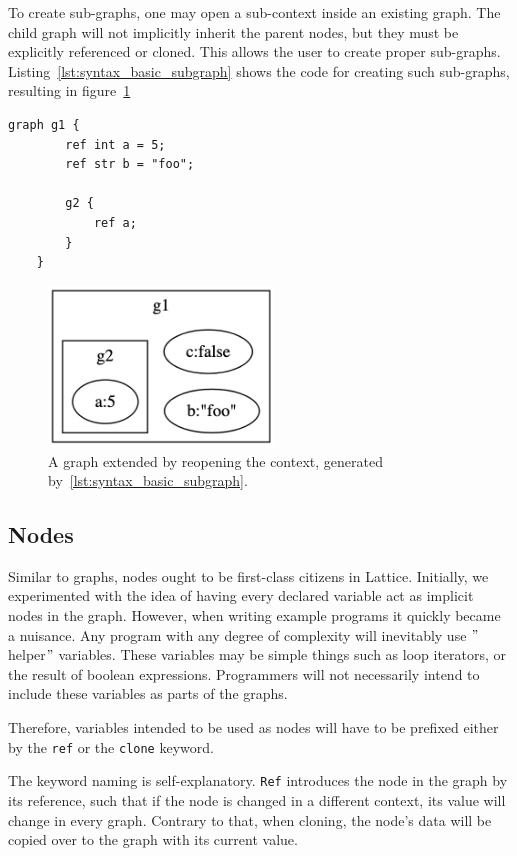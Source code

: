 To create sub-graphs, one may open a sub-context inside an existing graph.
The child graph will not implicitly inherit the parent nodes, but they must be explicitly referenced or cloned.
This allows the user to create proper sub-graphs.
Listing~\ref{lst:syntax_basic_subgraph} shows the code for creating such sub-graphs, resulting in figure~\ref{fig:syntax_basic_subgraph}

\begin{lstlisting}[caption={Creating a sub-graph g2 in the context of g1},captionpos=b, label={lst:syntax_basic_subgraph}]
    graph g1 {
        ref int a = 5;
        ref str b = "foo";

        g2 {
            ref a;
        }
    }
\end{lstlisting}
\begin{figure}[H]
    \centering
    \includegraphics[width=6cm]{figures/syntax_section/syntax_basic_subgraph}
    \caption{A graph extended by reopening the context, generated by~\ref{lst:syntax_basic_subgraph}.}
    \label{fig:syntax_basic_subgraph}
\end{figure}

\subsection{Nodes}\label{subsec:syntax_nodes}
Similar to graphs, nodes ought to be first-class citizens in Lattice.
Initially, we experimented with the
idea of having every declared variable act as implicit nodes in the graph.
However, when writing example programs it quickly became a nuisance.
Any program with any degree of complexity will inevitably use \("\)helper\("\) variables.
These variables may be simple things such as loop iterators, or the result of boolean expressions.
Programmers will not necessarily intend to include these variables as parts of the graphs.

Therefore, variables intended to be used as nodes will have to be prefixed either by the \lstinline{ref}
or the \lstinline{clone} keyword.

The keyword naming is self-explanatory.
\lstinline{Ref} introduces the node in the graph by its reference, such that if
the node is changed in a different context, its value will change in every graph.
Contrary to that, when cloning, the node's data will be copied over to the graph with its current value.

